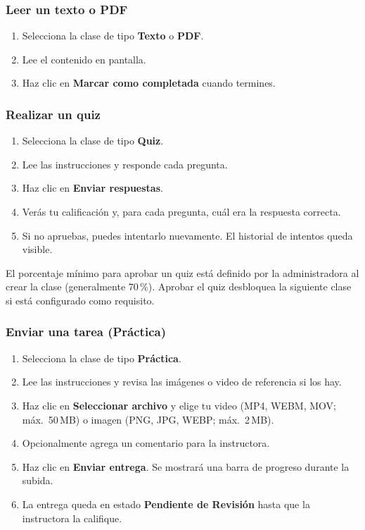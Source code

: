 \documentclass[a4paper,11pt]{article}
\begin{document}
\subsubsection{Leer un texto o PDF}

\begin{enumerate}
  \item Selecciona la clase de tipo \textbf{Texto} o \textbf{PDF}.
  \item Lee el contenido en pantalla.
  \item Haz clic en \textbf{Marcar como completada} cuando termines.
\end{enumerate}

\subsubsection{Realizar un quiz}

\begin{enumerate}
  \item Selecciona la clase de tipo \textbf{Quiz}.
  \item Lee las instrucciones y responde cada pregunta.
  \item Haz clic en \textbf{Enviar respuestas}.
  \item Ver\'as tu calificaci\'on y, para cada pregunta, cu\'al era
        la respuesta correcta.
  \item Si no apruebas, puedes intentarlo nuevamente.
        El historial de intentos queda visible.
\end{enumerate}

\begin{infobox}
El porcentaje m\'inimo para aprobar un quiz est\'a definido por la administradora
al crear la clase (generalmente 70\,\%). Aprobar el quiz desbloquea la
siguiente clase si est\'a configurado como requisito.
\end{infobox}

\subsubsection{Enviar una tarea (Pr\'actica)}

\begin{enumerate}
  \item Selecciona la clase de tipo \textbf{Pr\'actica}.
  \item Lee las instrucciones y revisa las im\'agenes o video de referencia
        si los hay.
  \item Haz clic en \textbf{Seleccionar archivo} y elige tu video (MP4, WEBM, MOV;
        m\'ax.\ 50\,MB) o imagen (PNG, JPG, WEBP; m\'ax.\ 2\,MB).
  \item Opcionalmente agrega un comentario para la instructora.
  \item Haz clic en \textbf{Enviar entrega}. Se mostrar\'a una barra de progreso
        durante la subida.
  \item La entrega queda en estado \textbf{Pendiente de Revisi\'on} hasta que
        la instructora la califique.
\end{enumerate}
\end{document}
